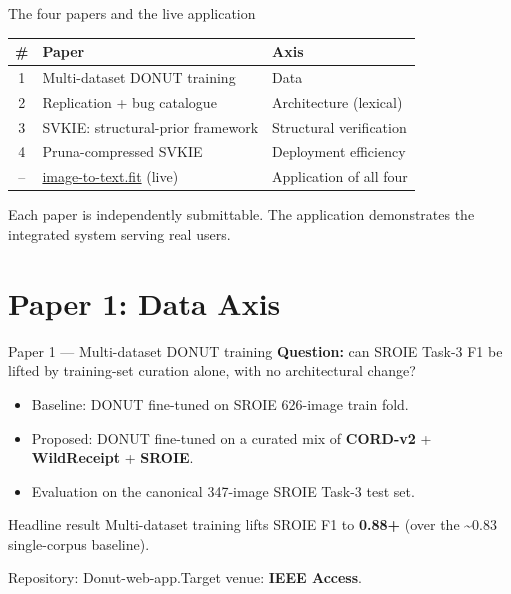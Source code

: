 \documentclass{beamer}
\begin{document}
\begin{frame}{The four papers and the live application}
  \begin{center}
  \begin{tabular}{cll}
    \toprule
    \# & Paper & Axis \\ \midrule
    1 & Multi-dataset DONUT training        & Data \\
    2 & Replication + bug catalogue         & Architecture (lexical) \\
    3 & SVKIE: structural-prior framework   & Structural verification \\
    4 & Pruna-compressed SVKIE              & Deployment efficiency \\
    \midrule
    -- & \href{https://image-to-text.fit/}{image-to-text.fit} (live) & Application of all four \\
    \bottomrule
  \end{tabular}
  \end{center}
  \vspace{1em}
  Each paper is independently submittable.  The application demonstrates
  the integrated system serving real users.
\end{frame}

\section{Paper 1: Data Axis}
\begin{frame}{Paper 1 --- Multi-dataset DONUT training}
  \textbf{Question:} can SROIE Task-3 F1 be lifted by training-set
  curation alone, with no architectural change?
  \vspace{0.5em}
  \begin{itemize}
    \item Baseline: DONUT fine-tuned on SROIE 626-image train fold.
    \item Proposed: DONUT fine-tuned on a curated mix of
          \textbf{CORD-v2} + \textbf{WildReceipt} + \textbf{SROIE}.
    \item Evaluation on the canonical 347-image SROIE Task-3 test set.
  \end{itemize}
  \begin{block}{Headline result}
    Multi-dataset training lifts SROIE F1 to \textbf{0.88+} (over the
    \textasciitilde{}0.83 single-corpus baseline).
  \end{block}
  Repository: Donut-web-app.\quad Target venue: \textbf{IEEE Access}.
\end{frame}
\end{document}

